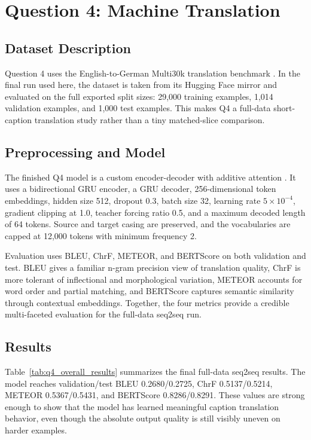 \section{Question 4: Machine Translation}

\subsection{Dataset Description}

Question 4 uses the English-to-German Multi30k translation benchmark \cite{elliott2016multi30k}. In the final run used here, the dataset is taken from its Hugging Face mirror and evaluated on the full exported split sizes: 29{,}000 training examples, 1{,}014 validation examples, and 1{,}000 test examples. This makes Q4 a full-data short-caption translation study rather than a tiny matched-slice comparison.

\subsection{Preprocessing and Model}

The finished Q4 model is a custom encoder-decoder with additive attention \cite{bahdanau2015nmt}. It uses a bidirectional GRU encoder, a GRU decoder, 256-dimensional token embeddings, hidden size 512, dropout 0.3, batch size 32, learning rate \(5 \times 10^{-4}\), gradient clipping at 1.0, teacher forcing ratio 0.5, and a maximum decoded length of 64 tokens. Source and target casing are preserved, and the vocabularies are capped at 12{,}000 tokens with minimum frequency 2.

Evaluation uses BLEU, ChrF, METEOR, and BERTScore on both validation and test. BLEU gives a familiar n-gram precision view of translation quality, ChrF is more tolerant of inflectional and morphological variation, METEOR accounts for word order and partial matching, and BERTScore captures semantic similarity through contextual embeddings. Together, the four metrics provide a credible multi-faceted evaluation for the full-data seq2seq run.

\subsection{Results}

Table~\ref{tab:q4_overall_results} summarizes the final full-data seq2seq results. The model reaches validation/test BLEU 0.2680/0.2725, ChrF 0.5137/0.5214, METEOR 0.5367/0.5431, and BERTScore 0.8286/0.8291. These values are strong enough to show that the model has learned meaningful caption translation behavior, even though the absolute output quality is still visibly uneven on harder examples.

